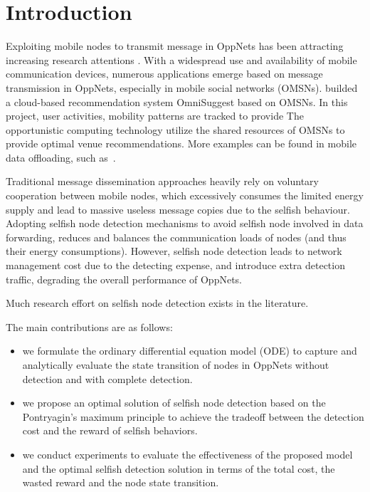 \section{Introduction}
\label{sec:intro}
Exploiting mobile nodes to transmit message in
OppNets has been attracting
increasing research attentions
\cite{DBLP:conf/sigcomm/SouzaMSMCC16,
DBLP:conf/infocom/LuSP16,
DBLP:conf/mobicom/RadenkovicH17,
DBLP:journals/comsur/JedariXN18,
DBLP:journals/tmc/LoretiB20}.
With a widespread use and availability of
mobile communication devices, numerous applications
emerge based on message transmission in OppNets,
especially in mobile social networks (OMSNs).
\cite{DBLP:journals/tsc/KhalidKKZ14} builded a
cloud-based recommendation system OmniSuggest 
based on OMSNs. In this project, user activities,
mobility patterns are tracked to provide 
The opportunistic computing technology utilize
the shared resources of OMSNs to
provide optimal venue recommendations.
More examples can be found in mobile data offloading,
such as~\cite{DBLP:journals/tmc/HanHKMSS12,
DBLP:journals/tmc/LiQJHW014}.

Traditional message dissemination approaches
heavily rely on voluntary cooperation between
mobile nodes, which excessively consumes the
limited energy supply and lead to massive useless
message copies due to the selfish behaviour.
Adopting selfish node detection mechanisms
to avoid selfish node involved in data forwarding,
reduces and balances the communication loads
of nodes (and thus their energy consumptions).
However, selfish node detection leads to network
management cost due to the detecting expense, and
introduce extra detection traffic,
degrading the overall performance of OppNets.

Much research effort on selfish node detection
exists in the literature.





The main contributions are as follows:

\begin{itemize}
\item {we formulate the ordinary differential equation model (ODE)
to capture and analytically evaluate the state transition of nodes
in OppNets without detection and with complete detection.}
\item {we propose an optimal solution of selfish node detection
based on the Pontryagin's maximum principle
to achieve the tradeoff between the detection cost
and the reward of selfish behaviors.}
\item {we conduct experiments to evaluate
the effectiveness of the proposed model
and the optimal selfish detection solution
in terms of the total cost, the wasted reward and the node state transition.}
\end{itemize}

